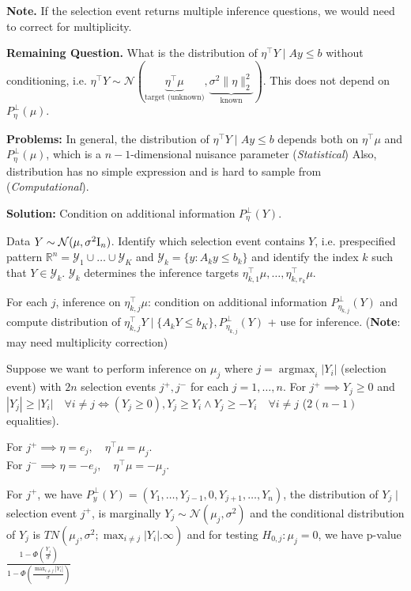 \textbf{Note.} If the selection event returns multiple inference questions, we would need to correct for multiplicity.

\textbf{Remaining Question.} What is the distribution of $\eta^{\top} Y \mid Ay \leq b$ without conditioning, i.e. $\eta^\top Y \sim \mathcal{N}(\underbrace{\eta^\top\mu}_{\text{target (unknown)}}, \underbrace{\sigma^2\lVert \eta\rVert_2^2}_{\text{known}})$. This does not depend on  $P_\eta^\perp(\mu)$.


\textbf{Problems:} In general, the distribution of $\eta^{\top} Y \mid Ay \leq b$ depends both on $\eta^\top \mu$ and $P^\perp_\eta (\mu)$, which is a $n-1$-dimensional nuisance parameter (\textit{Statistical}) Also, distribution has no simple expression and is hard to sample from (\textit{Computational}).

\textbf{Solution:} Condition on additional information $P_\eta^\perp(Y)$.

Data $Y\sim \mathcal{N}(\mu,\sigma^2\textup{I}_n)$. Identify which selection event contains $Y$, i.e. prespecified pattern $\mathbb{R}^n = \mathcal{Y}_1\cup\dots\cup\mathcal{Y}_K$ and $\mathcal{Y}_k = \{y\colon A_k y \leq b_k \}$ and identify the index $k$ such that $Y\in\mathcal{Y}_k$. $\mathcal{Y}_k$ determines the inference targets $\eta_{k,1}^\top\mu, \dots, \eta_{k,r_k}^\top \mu$. 

For each $j$, inference on $\eta^\top_{k,j}\mu$: condition on additional information $P^\perp_{\eta_{k,j}}(Y)$ and compute distribution of $\eta^\top_{k,j}Y \mid \{A_kY\leq b_K \}, P^\perp_{\eta_{k,j}}(Y)$ + use for inference. (\textbf{Note}: may need multiplicity correction)

\begin{example}
    Suppose we want to perform inference on $\mu_j$ where $j= \operatorname{argmax}_i|Y_i|$ (selection event) with $2n$ selection events $j^+, j^-$ for each $j=1,\dots,n$. For $j^+ \implies Y_j \geq 0$ and $|Y_j| \geq |Y_i| \quad \forall i\neq j \iff (Y_j \geq 0), Y_j\geq Y_i 
\wedge Y_j\geq -Y_i\quad \forall i\neq j$ ($2(n-1)$ equalities).
    
    For $j^+ \implies \eta=e_j, \quad \eta^\top\mu = \mu_j$.\\
    For $j^- \implies \eta=-e_j, \quad \eta^\top\mu = -\mu_j$.

For $j^+$, we have $P_y^\perp(Y) = (Y_1,\dots, Y_{j-1}, 0 , Y_{j+1},\dots, Y_n)$, the distribution of $Y_j \mid$ selection event $j^+$, is marginally $Y_j \sim \mathcal{N}(\mu_j, \sigma^2)$ and the conditional distribution of $Y_j$ is $TN(\mu_j, \sigma^2; \max_{i\neq j}|Y_i|. \infty)$ and for testing $H_{0,j}\colon \mu_j = 0$, we have p-value $\frac{1-\Phi\left(\frac{Y_j}{\sigma}\right)}{1-\Phi\left(\frac{\max_{i\neq j}|Y_i|}{\sigma}\right)}$ 
    
\end{example}

